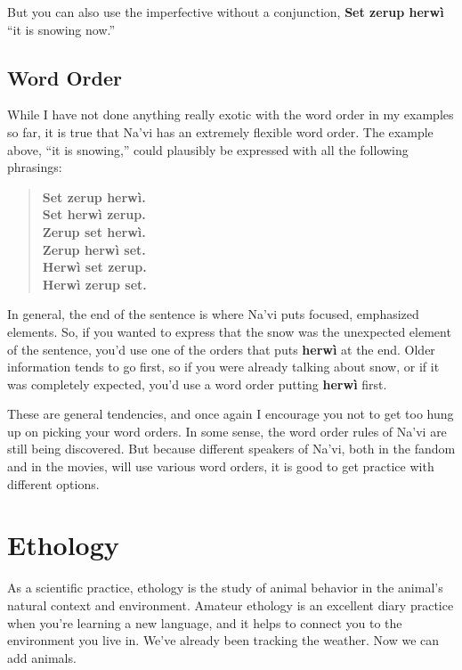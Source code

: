 \documentclass[nofonts]{tufte-handout}
\newcommand{\N}[1]{\textbf{\textcolor{navi}{#1}}}
\begin{document}
\noindent But you can also use the imperfective without a conjunction,
\N{Set zerup herwì} ``it is snowing now.''

\subsection*{Word Order}
While I have not done anything really exotic with the word order in my
examples so far, it is true that Na'vi has an extremely flexible word
order.  The example above, ``it is snowing,'' could plausibly be
expressed with all the following phrasings:

\begin{quotation}
  \noindent\N{Set zerup herwì.} \\
  \noindent\N{Set herwì zerup.} \\
  \noindent\N{Zerup set herwì.} \\
  \noindent\N{Zerup herwì set.} \\
  \noindent\N{Herwì set zerup.} \\
  \noindent\N{Herwì zerup set.}
\end{quotation}

\noindent In general, the end of the sentence is where Na'vi puts
focused, emphasized elements.  So, if you wanted to express that the
snow was the unexpected element of the sentence, you'd use one of the
orders that puts \N{herwì} at the end.  Older information
tends to go first, so if you were already talking about snow, or if it
was completely expected, you'd use a word order putting \N{herwì}
first.

These are general tendencies, and once again I encourage you not to
get too hung up on picking your word orders.  In some sense, the word
order rules of Na'vi are still being discovered.  But because
different speakers of Na'vi, both in the fandom and in the movies,
will use various word orders, it is good to get practice with
different options.


\section*{Ethology}
As a scientific practice, ethology is the study of animal behavior in
the animal's natural context and environment.  Amateur ethology is an
excellent diary practice when you're learning a new language, and it
helps to connect you to the environment you live in.  We've already
been tracking the weather.  Now we can add animals.
\end{document}
